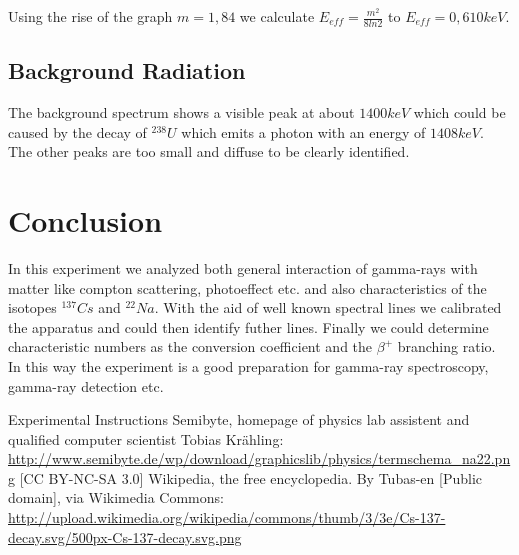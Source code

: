 \documentclass[bigchapter,colorback,accentcolor=tud4b,linedtoc,11pt]{tudreport}
\begin{document}
Using the rise of the graph $m=1,84$ we calculate $E_{eff}=\frac{m^2}{8ln2}$
to $E_{eff}=0,610 keV$.

\section{Background Radiation}

\begin{center}
\begin{figure}[H]
\end{figure}
\end{center}

The background spectrum shows a visible peak at about $1400keV$ which could be
caused by the decay of $^{238}U$ which emits a photon with an energy of
$1408keV$. The other peaks are too small and diffuse to be clearly identified.

\chapter{Conclusion}

In this experiment we analyzed both general interaction of gamma-rays with
matter like compton scattering, photoeffect etc. and also characteristics of the
isotopes $^{137}Cs$ and $^{22}Na$. With the aid of well known spectral lines we
calibrated the apparatus and could then identify futher lines. Finally we could
determine characteristic numbers as the conversion coefficient and the $\beta^+$
branching ratio. In this way the experiment is a good preparation for gamma-ray
spectroscopy, gamma-ray detection etc.

\cleardoublepage{}
\newpage
\begin{thebibliography}{100}
   {Experimental Instructions}  {Semibyte, homepage of physics lab assistent and qualified
      computer scientist Tobias Krähling:
      \url{http://www.semibyte.de/wp/download/graphicslib/physics/termschema_na22.png}
    [CC BY-NC-SA 3.0]}
   {Wikipedia, the free encyclopedia. By Tubas-en [Public
      domain], via Wikimedia Commons: \url{http://upload.wikimedia.org/wikipedia/commons/thumb/3/3e/Cs-137-decay.svg/500px-Cs-137-decay.svg.png}}
\end{thebibliography}
\end{document}
